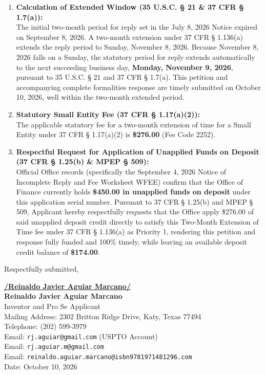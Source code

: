 \documentclass[11pt,letterpaper]{article}
\begin{document}
\begin{enumerate}[leftmargin=*]
    \item \textbf{Calculation of Extended Window (35 U.S.C. \S{} 21 \& 37 CFR \S{} 1.7(a)):} \\
    The initial two-month period for reply set in the July 8, 2026 Notice expired on September 8, 2026. A two-month extension under 37 CFR \S{} 1.136(a) extends the reply period to Sunday, November 8, 2026. Because November 8, 2026 falls on a Sunday, the statutory period for reply extends automatically to the next succeeding business day, \textbf{Monday, November 9, 2026}, pursuant to 35 U.S.C. \S{} 21 and 37 CFR \S{} 1.7(a). This petition and accompanying complete formalities response are timely submitted on October 10, 2026, well within the two-month extended period.

    \item \textbf{Statutory Small Entity Fee (37 CFR \S{} 1.17(a)(2)):} \\
    The applicable statutory fee for a two-month extension of time for a Small Entity under 37 CFR \S{} 1.17(a)(2) is \textbf{\$276.00} (Fee Code 2252).

    \item \textbf{Respectful Request for Application of Unapplied Funds on Deposit (37 CFR \S{} 1.25(b) \& MPEP \S{} 509):} \\
    Official Office records (specifically the September 4, 2026 Notice of Incomplete Reply and Fee Worksheet WFEE) confirm that the Office of Finance currently holds \textbf{\$450.00 in unapplied funds on deposit} under this application serial number. Pursuant to 37 CFR \S{} 1.25(b) and MPEP \S{} 509, Applicant hereby respectfully requests that the Office apply \$276.00 of said unapplied deposit credit directly to satisfy this Two-Month Extension of Time fee under 37 CFR \S{} 1.136(a) as Priority 1, rendering this petition and response fully funded and 100\% timely, while leaving an available deposit credit balance of \textbf{\$174.00}.
\end{enumerate}

\vspace{0.6cm}
\begin{singlespace}
\noindent Respectfully submitted, \par\vspace{0.8cm}
\underline{\textbf{/Reinaldo Javier Aguiar Marcano/}} \\
\textbf{Reinaldo Javier Aguiar Marcano} \\
Inventor and Pro Se Applicant \\
Mailing Address: 2302 Britton Ridge Drive, Katy, Texas 77494 \\
Telephone: (202) 599-3979 \\
Email: \texttt{rj.aguiar@gmail.com} (USPTO Account) \\
Email: \texttt{rj.aguiar.m@gmail.com} \\
Email: \texttt{reinaldo.aguiar.marcano@isbn9781971481296.com} \\
Date: October 10, 2026
\end{singlespace}
\end{document}
